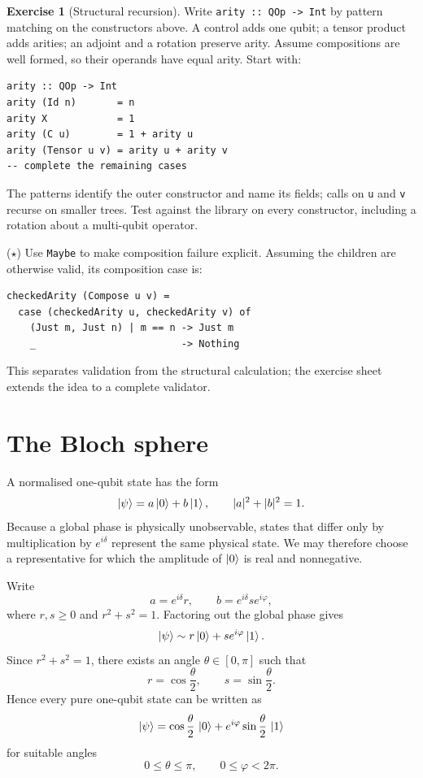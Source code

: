 \documentclass[11pt,a4paper]{article}
\theoremstyle{definition}
\newtheorem{exercise}{Exercise}[section]
\begin{document}
\begin{exercise}[Structural recursion]
Write \lstinline|arity :: QOp -> Int| by pattern matching on the constructors
above.  A control adds one qubit; a tensor product adds arities; an adjoint
and a rotation preserve arity.  Assume compositions are well formed, so their
operands have equal arity.
Start with:
\begin{lstlisting}
arity :: QOp -> Int
arity (Id n)       = n
arity X            = 1
arity (C u)        = 1 + arity u
arity (Tensor u v) = arity u + arity v
-- complete the remaining cases
\end{lstlisting}
The patterns identify the outer constructor and name its fields; calls on
\lstinline|u| and \lstinline|v| recurse on smaller trees.  Test against the
library on every constructor, including a rotation about a multi-qubit
operator.

($\star$) Use \lstinline|Maybe| to make composition failure explicit.  Assuming
the children are otherwise valid, its composition case is:
\begin{lstlisting}
checkedArity (Compose u v) =
  case (checkedArity u, checkedArity v) of
    (Just m, Just n) | m == n -> Just m
    _                         -> Nothing
\end{lstlisting}
This separates validation from the structural calculation; the exercise sheet
extends the idea to a complete validator.
\end{exercise}


\section{The Bloch sphere}
\label{sec:bloch}

A normalised one-qubit state has the form
\[
  \left| \psi \right\rangle = a\left| 0 \right\rangle+b\left| 1 \right\rangle,
  \qquad |a|^2+|b|^2=1.
\]
Because a global phase is physically unobservable, states that differ only by
multiplication by $e^{i\delta}$ represent the same physical state.  We may
therefore choose a representative for which the amplitude of $\left| 0 \right\rangle$ is real
and nonnegative.

Write
\[
  a = e^{i\delta}r,
  \qquad
  b = e^{i\delta}se^{i\varphi},
\]
where $r,s\ge 0$ and $r^2+s^2=1$.  Factoring out the global phase gives
\[
  \left| \psi \right\rangle
  \sim
  r\left| 0 \right\rangle+s e^{i\varphi}\left| 1 \right\rangle.
\]
Since $r^2+s^2=1$, there exists an angle $\theta\in[0,\pi]$ such that
\[
  r=\cos\frac{\theta}{2},
  \qquad
  s=\sin\frac{\theta}{2}.
\]
Hence every pure one-qubit state can be written as
\[
  \left| \psi \right\rangle=
  \cos\frac{\theta}{2}\,\left| 0 \right\rangle
  + e^{i\varphi}\sin\frac{\theta}{2}\,\left| 1 \right\rangle
\]
for suitable angles
\[
  0\le\theta\le\pi,
  \qquad
  0\le\varphi<2\pi.
\]
\end{document}
